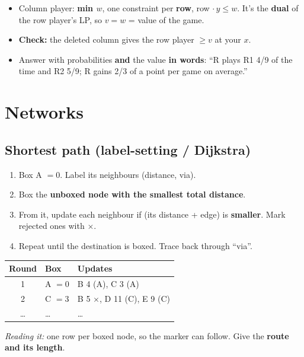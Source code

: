 \documentclass[10pt,a4paper]{article}
\newcommand{\reading}[1]{\textit{Reading it:} #1}
\newcommand{\thead}[1]{\textbf{#1}}
\begin{document}
\begin{itemize}
  \item Column player: \textbf{min $w$}, one constraint per \textbf{row}, row $\cdot\, y \leq w$. It's the \textbf{dual} of the row player's LP, so $v = w$ = value of the game.
  \item \textbf{Check:} the deleted column gives the row player $\geq v$ at your $x$.
  \item Answer with probabilities \textbf{and} the value \textbf{in words}: ``R plays R1 4/9 of the time and R2 5/9; R gains 2/3 of a point per game on average.''
\end{itemize}

\section{Networks}

\subsection{Shortest path (label-setting / Dijkstra)}

\begin{enumerate}
  \item Box A $= 0$. Label its neighbours (distance, via).
  \item Box the \textbf{unboxed node with the smallest total distance}.
  \item From it, update each neighbour if (its distance + edge) is \textbf{smaller}. Mark rejected ones with $\times$.
  \item Repeat until the destination is boxed. Trace back through ``via''.
\end{enumerate}

\begin{center}
\begin{tabular}{@{}c l l@{}}
\toprule
\thead{Round} & \thead{Box} & \thead{Updates} \\
\midrule
1 & A $= 0$ & B 4 (A), C 3 (A) \\
2 & C $= 3$ & B 5 $\times$, D 11 (C), E 9 (C) \\
\ldots & \ldots & \ldots \\
\bottomrule
\end{tabular}
\end{center}

\reading{one row per boxed node, so the marker can follow. Give the \textbf{route and its length}.}
\end{document}
